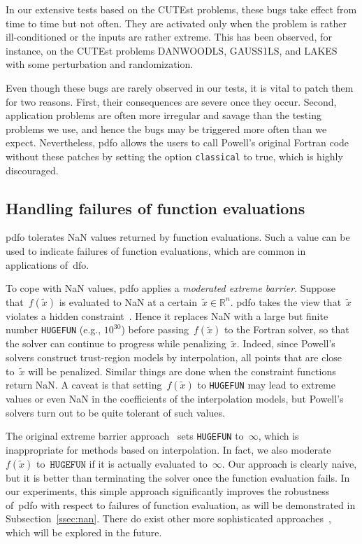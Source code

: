 \documentclass{article}
\numberwithin{equation}{section}
\theoremstyle{definition}
\theoremstyle{plain}
\theoremstyle{remark}
\newcommand*{\R}{\mathbb{R}}
\newcommand{\obj}{f}
\begin{document}
In our extensive tests based on the CUTEst problems, these bugs take effect from time to time but not often.
They are activated only when the problem is rather ill-conditioned or the inputs are rather extreme.
This has been observed, for instance, on the CUTEst problems DANWOODLS, GAUSS1LS, and LAKES with some perturbation and randomization.

Even though these bugs are rarely observed in our tests, it is vital to patch them for two reasons.
First, their consequences are severe once they occur.
Second, application problems are often more irregular and savage than the testing problems we use, and hence the bugs may be triggered more often than we expect.
Nevertheless, \gls{pdfo} allows the users to call Powell's original Fortran code without these patches by setting the option \texttt{classical} to true, which is highly discouraged.

\subsection{Handling failures of function evaluations}
\label{ssec:barrier}

\Gls{pdfo} tolerates NaN values returned by function evaluations.
Such a value can be used to indicate failures of function evaluations, which are common in applications of~\gls{dfo}.

To cope with NaN values, \gls{pdfo} applies a \emph{moderated extreme barrier}.
Suppose that~$\obj(\tilde{x})$ is evaluated to NaN at a certain~$\tilde{x}\in\R^n$.
\Gls{pdfo} takes the view that~$\tilde{x}$ violates a hidden constraint~\cite{LeDigabel_Wild_2023,Audet_Caporossi_Jacquet_2020}.
Hence it replaces NaN with a large but finite number \texttt{HUGEFUN} (e.g., $10^{30}$) before passing~$\obj(\tilde{x})$ to the Fortran solver, so that the solver can continue to progress while penalizing~$\tilde{x}$.
Indeed, since Powell's solvers construct trust-region models by interpolation, all points that are close to~$\tilde{x}$ will be penalized.
Similar things are done when the constraint functions return NaN.
A caveat is that setting~$\obj(\tilde{x})$ to \texttt{HUGEFUN} may lead to extreme values or even NaN in the coefficients of the interpolation models, but Powell's solvers turn out to be quite tolerant of such values.

The original extreme barrier approach~\cite[Equation~(13.2)]{Conn_Scheinberg_Vicente_2009b} sets \texttt{HUGEFUN} to~$\infty$, which is inappropriate for methods based on interpolation.
In fact, we also moderate~$\obj(\tilde{x})$ to~$\texttt{HUGEFUN}$ if it is actually evaluated to~$\infty$.
Our approach is clearly naive, but it is better than terminating the solver once the function evaluation fails.
In our experiments, this simple approach significantly improves the robustness of~\gls{pdfo} with respect to failures of function evaluation, as will be demonstrated in Subsection~\ref{ssec:nan}.
There do exist other more sophisticated approaches~\cite{Audet_Caporossi_Jacquet_2020}, which will be explored in the future.
\end{document}
